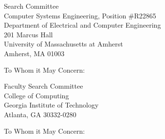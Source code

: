 \begin{letter}
{Search Committee\\
Computer Systems Engineering, Position \#R22865\\
Department of Electrical and Computer Engineering\\
201 Marcus Hall\\
University of Massachusetts at Amherst\\
Amherst, MA 01003}
\opening{To Whom it May Concern:}
\text
\end{letter}

\begin{letter}
{ Faculty Search Committee\\
College of Computing\\
Georgia Institute of Technology\\
Atlanta, GA 30332-0280}
\opening{To Whom it May Concern:}
\text
\end{letter}

